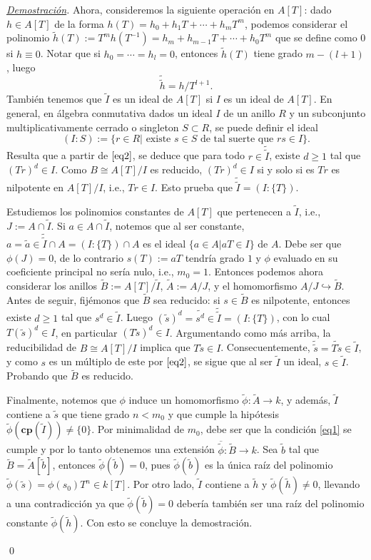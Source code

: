 \documentclass[12pt]{article}
\theoremstyle{customTheorem}
\theoremstyle{customDefinition}
\renewenvironment{proof}[1][Demostración]{\noindent \textit{\underline{#1}.\hspace{2mm}}}{\hfill\qed}
\renewcommand{\bar}[1]{\overline{#1}}
\renewcommand{\tilde}[1]{\widetilde{#1}}
\newcommand{\cp}[1]{\textbf{cp}(#1)}
\begin{document}
\begin{proof}
    Ahora, consideremos la siguiente operación en $A[T]$: dado $h \in A[T]$ de la forma $h (T) = h_0 + h_1 T + \cdots + h_m T^m$, podemos considerar el polinomio $\tilde h (T) := T^m h(T^{-1}) = h_m + h_{m-1}T + \cdots + h_0 T^m$ que se define como $0$ si $h \equiv 0$. Notar que si $h_0 = \cdots = h_l = 0$, entonces $\tilde h (T)$ tiene grado $m-(l+1)$, luego
    \begin{equation}\label{eq2}
        \tilde{\tilde{h}} = h/T^{l+1}.
    \end{equation}
    También tenemos que $\tilde I$ es un ideal de $A[T]$ si $I$ es un ideal de $A[T]$. En general, en álgebra conmutativa dados un ideal $I$ de un anillo $R$ y un subconjunto multiplicativamente cerrado o singleton $S \subset R$, se puede definir el ideal
    \[
    (I : S) := \{r \in R | \text{ existe $s \in S$ de tal suerte que } r s \in I\}.
    \]
    Resulta que a partir de $\eqref{eq2}$, se deduce que para todo $r \in \tilde{\tilde{I}}$, existe $d \geq 1$ tal que $(Tr)^d \in I$. Como $B \cong A[T]/I$ es reducido, $(Tr)^d \in I$ si y solo si es $Tr$ es nilpotente en $A[T]/I$, i.e., $Tr \in I$. Esto prueba que $\tilde{\tilde{I}} = (I: \{T\})$.

    Estudiemos los polinomios constantes de $A[T]$ que pertenecen a $\tilde I$, i.e., $J := A \cap \tilde I$. Si $a \in A \cap \tilde I$, notemos que al ser constante, $a = \tilde a \in \tilde{\tilde{I}} \cap A = (I : \{T\}) \cap A$ es el ideal $\{ a \in A | a T \in I\}$ de $A$. Debe ser que $\phi (J) = 0$, de lo contrario $s(T) := a T$ tendría grado $1$ y $\phi$ evaluado en su coeficiente principal no sería nulo, i.e., $m_0 = 1$. Entonces podemos ahora considerar los anillos $\tilde B := A[T] / \tilde I$, $\tilde A := A/J$, y el homomorfismo $A/J \hookrightarrow \tilde B$. Antes de seguir, fijémonos que $\tilde B$ sea reducido: si $s \in \tilde B$ es nilpotente, entonces existe $d \geq 1$ tal que $s^d \in \tilde I$. Luego $(\tilde s)^d = \tilde {s^d} \in \tilde{\tilde{I}} = (I:\{T\})$, con lo cual $T (\tilde s )^d \in I$, en particular $(T \tilde s ) ^d \in I$. Argumentando como más arriba, la reducibilidad de $B \cong A[T]/I$ implica que $T \tilde s \in I$. Consecuentemente, $\tilde{\tilde{s}} = \tilde{T \tilde s} \in \tilde I$, y como $s$ es un múltiplo de este por $\eqref{eq2}$, se sigue que al ser $\tilde I$ un ideal, $s \in \tilde I$. Probando que $\tilde B$ es reducido.

    Finalmente, notemos que $\phi$ induce un homomorfismo $\tilde \phi : \tilde A \to k$, y además, $\tilde I$ contiene a $\tilde s$ que tiene grado $n < m_0$ y que cumple la hipótesis $\tilde \phi (\cp {\tilde I}) \neq \{0\}$. Por minimalidad de $m_0$, debe ser que la condición \eqref{eq1} se cumple y por lo tanto obtenemos una extensión $\bar {\tilde \phi } : \tilde B \to k$. Sea $\tilde b$ tal que $\tilde B = \tilde A [\tilde b]$, entonces $\tilde \phi (\tilde b) = 0$, pues $\tilde \phi (\tilde b)$ es la única raíz del polinomio $\tilde \phi (\tilde s) = \phi (s_0) T^n \in k[T]$. Por otro lado, $\tilde I$ contiene a $\tilde h$ y $\tilde \phi (\tilde h) \neq 0$, llevando a una contradicción ya que $\tilde \phi (\tilde b) = 0$ debería también ser una raíz del polinomio constante $\tilde \phi (\tilde h)$. Con esto se concluye la demostración.


\end{proof}
\end{document}
